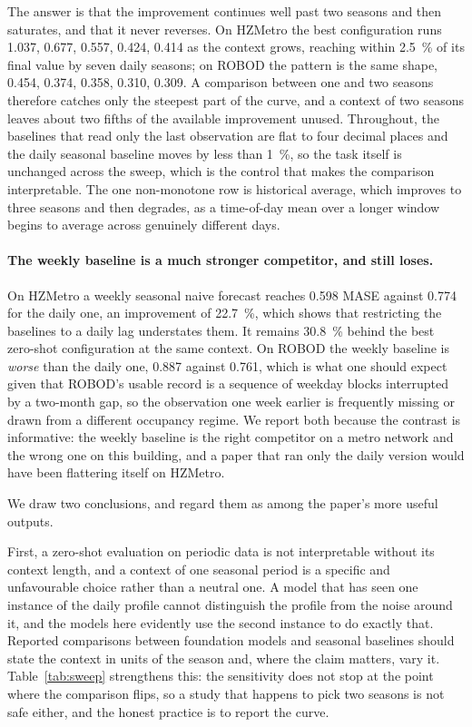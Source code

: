 \documentclass[utf8]{FrontiersinHarvard}
\newif\ifrevisionmarkup
\newcommand{\new}[1]{\ifrevisionmarkup\textcolor{revision}{#1}\else#1\fi}
\newif\ifsecondrevisionmarkup
\newcommand{\rev}[1]{\ifsecondrevisionmarkup\textcolor{revisiontwo}{#1}\else#1\fi}
\theoremstyle{plain}
\theoremstyle{definition}
\theoremstyle{remark}
\begin{document}
\new{The answer is that the improvement continues well past two seasons and then saturates, and that it never reverses. On HZMetro the best configuration runs \num{1.037}, \num{0.677}, \num{0.557}, \num{0.424}, \num{0.414} as the context grows, reaching within \SI{2.5}{\percent} of its final value by seven daily seasons; on ROBOD the pattern is the same shape, \num{0.454}, \num{0.374}, \num{0.358}, \num{0.310}, \num{0.309}. \rev{A comparison between one and two seasons therefore catches only the steepest part of the curve, and a context of two seasons leaves about two fifths of the available improvement unused.} Throughout, the baselines that read only the last observation are flat to four decimal places and the daily seasonal baseline moves by less than \SI{1}{\percent}, so the task itself is unchanged across the sweep, which is the control that makes the comparison interpretable. The one non-monotone row is historical average, which improves to three seasons and then degrades, as a time-of-day mean over a longer window begins to average across genuinely different days.}

\new{\paragraph{The weekly baseline is a much stronger competitor, and still loses.} On HZMetro a weekly seasonal naive forecast reaches \num{0.598} MASE against \num{0.774} for the daily one, an improvement of \SI{22.7}{\percent}, \rev{which shows that restricting the baselines to a daily lag understates them}. It remains \SI{30.8}{\percent} behind the best zero-shot configuration at the same context. On ROBOD the weekly baseline is \emph{worse} than the daily one, \num{0.887} against \num{0.761}, which is what one should expect given that ROBOD's usable record is a sequence of weekday blocks interrupted by a two-month gap, so the observation one week earlier is frequently missing or drawn from a different occupancy regime. We report both because the contrast is informative: the weekly baseline is the right competitor on a metro network and the wrong one on this building, and a paper that ran only the daily version would have been flattering itself on HZMetro.}

We draw two conclusions, and regard them as among the paper's more useful outputs.

First, a zero-shot evaluation on periodic data is not interpretable without its context length, and a context of one seasonal period is a specific and unfavourable choice rather than a neutral one. A model that has seen one instance of the daily profile cannot distinguish the profile from the noise around it, and the models here evidently use the second instance to do exactly that. Reported comparisons between foundation models and seasonal baselines should state the context in units of the season and, where the claim matters, vary it. \new{Table~\ref{tab:sweep} strengthens this: the sensitivity does not stop at the point where the comparison flips, so a study that happens to pick two seasons is not safe either, and the honest practice is to report the curve.}
\end{document}
